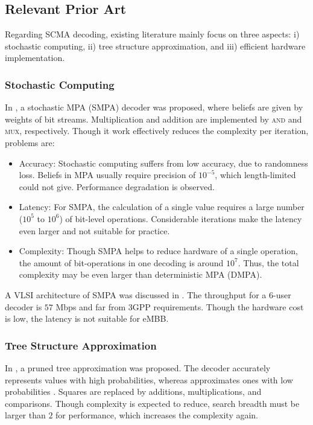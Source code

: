 \documentclass[journal,twoside]{IEEEtran}
\begin{document}
\subsection{Relevant Prior Art}
Regarding SCMA decoding, existing literature mainly focus on three aspects: i) stochastic computing, ii) tree structure approximation, and iii) efficient hardware implementation.

\subsubsection{Stochastic Computing}
In \cite{SMPA_1}, a stochastic MPA (SMPA) decoder was proposed, where beliefs are given by weights of bit streams. Multiplication and addition are implemented by \textsc{and} and \textsc{mux}, respectively. Though it work effectively reduces the complexity per iteration, problems are:

\begin{itemize}
\item Accuracy: Stochastic computing suffers from low accuracy, due to randomness loss. Beliefs in MPA usually require precision of $10^{-5}$, which length-limited could not give. Performance degradation is observed.
\item Latency: For SMPA, the calculation of a single value requires a large number ($10^{5}$ to $10^{6}$) of bit-level operations. Considerable iterations make the latency even larger and not suitable for practice.
\item Complexity: Though SMPA helps to reduce hardware of a single operation, the amount of bit-operations in one decoding is around $10^{7}$. Thus, the total complexity may be even larger than deterministic MPA (DMPA).
\end{itemize}
A VLSI architecture of SMPA was discussed in \cite{SMPA_2}. The throughput for a $6$-user decoder is $57$ Mbps and far from 3GPP requirements. Though the hardware cost is low, the latency is not suitable for eMBB.

\subsubsection{Tree Structure Approximation}
In \cite{tree_1}, a pruned tree approximation was proposed.
The decoder accurately represents values with high probabilities, whereas approximates ones with low probabilities \cite{fossorier1999reduced}. Squares are replaced by additions, multiplications, and comparisons. Though complexity is expected to reduce, search breadth must be larger than $2$ for performance, which increases the complexity again.
\end{document}
